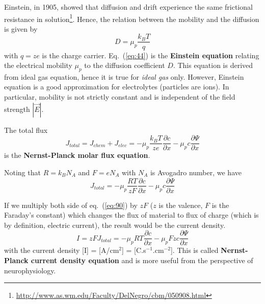 Einstein, in 1905, showed that diffusion and drift experience the same
frictional resistance in
solution\footnote{\url{http://www.as.wm.edu/Faculty/DelNegro/cbm/050908.html}}.
Hence, the relation between the mobility and the diffusion is given by
\begin{equation}
  \label{eq:44}
  D = \mu_p \frac{k_BT}{q}
\end{equation}
with $q=ze$ is the charge carrier.  Eq.~(\ref{eq:44}) is the
{\bf Einstein equation} relating the electrical mobility $\mu_p$ to
the diffusion coefficient $D$. This equation is derived from ideal gas
equation, hence it is true for {\it ideal gas} only. However, Einstein
equation is a good approximation for electrolytes (particles are
ions).  In particular, mobility is not strictly constant and is
independent of the field strength $|\vec{E}|$.



The total flux
\begin{equation}
  \label{eq:89}
  J_{total} = J_{chem} + J_{elec} = -\mu_p \frac{k_BT}{ze}
  \frac{\partial c}{\partial x} - \mu_p c \frac{\partial \Psi}{\partial x}
\end{equation}
is the {\bf Nernst-Planck molar flux equation}.

Noting that $R = k_BN_A$ and $F=eN_A$ with $N_A$ is Avogadro number, we
have
\begin{equation}
  \label{eq:90}
  J_{total} =  -\mu_p \frac{RT}{zF}
  \frac{\partial c}{\partial x} - \mu_p  c \frac{\partial \Psi}{\partial x}
\end{equation}

If we multiply both side of eq.~(\ref{eq:90}) by $zF$ ($z$ is the
valence, $F$ is the Faraday's constant) which changes the flux of
material to flux of charge (which is by definition, electric current),
the result would be the current density.
\begin{equation}
  \label{eq:91}
  I = zFJ_{total} =  -\mu_p RT
  \frac{\partial c}{\partial x} - \mu_p Fz c \frac{\partial \Psi}{\partial x}
\end{equation}
with the current density [I] = [A/cm$^2$] =
[C.s$^{-1}$.cm$^{-2}$]. This is called
{\bf Nernst-Planck current density equation} and is more useful from
the perspective of neurophysiology.


